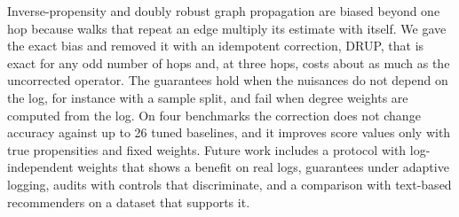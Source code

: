 Inverse-propensity and doubly robust graph propagation are biased beyond one hop
because walks that repeat an edge multiply its estimate with itself. We gave the
exact bias and removed it with an idempotent correction, DRUP, that is exact for any odd
number of hops and, at three hops, costs about as much as the uncorrected operator.
The guarantees hold when the nuisances do not depend on the log, for instance with a
sample split, and fail when degree weights are computed from the log. On four
benchmarks the correction does not change accuracy against up to 26 tuned baselines,
and it improves score values only with true propensities and fixed weights. Future work
includes a protocol with log-independent weights that shows a benefit on real logs,
guarantees under adaptive logging, audits with controls that discriminate, and a
comparison with text-based recommenders on a dataset that supports it.
